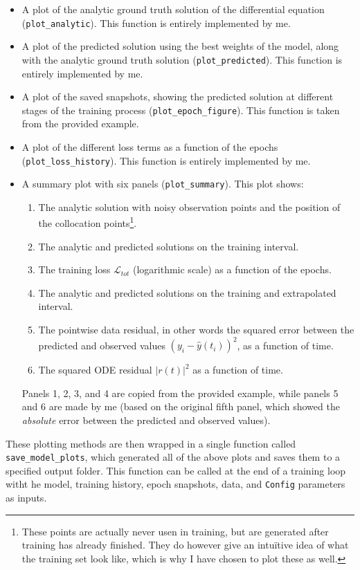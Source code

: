 \documentclass[we,twoside,openright,a4paper,11pt]{uantwerpenbamathesis}
\begin{document}
\begin{itemize}
    \item A plot of the analytic ground truth solution of the differential equation (\verb|plot_analytic|). This function is entirely implemented by me.
    \item A plot of the predicted solution using the best weights of the model, along with the analytic ground truth solution (\verb|plot_predicted|). This function is entirely implemented by me.
    \item A plot of the saved snapshots, showing the predicted solution at different stages of the training process (\verb|plot_epoch_figure|). This function is taken from the provided example.
    \item A plot of the different loss terms as a function of the epochs (\verb|plot_loss_history|). This function is entirely implemented by me.
    \item A summary plot with six panels (\verb|plot_summary|). This plot shows:
    \begin{enumerate}
        \item The analytic solution with noisy observation points and the position of the collocation points\footnote{These points are actually never usen in training, but are generated after training has already finished. They do however give an intuïtive idea of what the training set look like, which is why I have chosen to plot these as well.}.
        \item The analytic and predicted solutions on the training interval.
        \item The training loss $\mathcal{L}_{tot}$ (logarithmic scale) as a function of the epochs.
        \item The analytic and predicted solutions on the training and extrapolated interval. 
        \item The pointwise data residual, in other words the squared error between the predicted and observed values $(y_i-\hat{y}(t_i))^2$, as a function of time.
        \item The squared ODE residual $|r(t)|^2$ as a function of time.
    \end{enumerate}
    Panels 1, 2, 3, and 4 are copied from the provided example, while panels 5 and 6 are made by me (based on the original fifth panel, which showed the \textit{absolute} error between the predicted and observed values).
\end{itemize}
These plotting methods are then wrapped in a single function called \verb|save_model_plots|, which generated all of the above plots and saves them to a specified output folder. This function can be called at the end of a training loop witht he model, training history, epoch snapshots, data, and \verb|Config| parameters as inputs.\\
\end{document}
